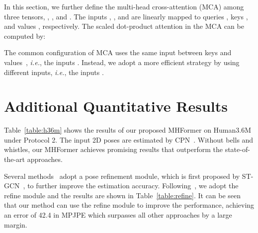 \documentclass[10pt,twocolumn,letterpaper]{article}
\begin{document}
In this section, we further define the multi-head cross-attention (MCA) among three tensors, , , and . 
The inputs , , and  are linearly mapped to queries , keys , and values , respectively. 
The scaled dot-product attention in the MCA can be computed by:    

The common configuration of MCA uses the same input between keys and values~\cite{liu2021video,xu2021cdtrans,chen2021crossvit}, \textit{i.e.}, the inputs . 
Instead, we adopt a more efficient strategy by using different inputs, \textit{i.e.}, the inputs . 

\section{Additional Quantitative Results}
Table~\ref{table:h36m} shows the results of our proposed MHFormer on Human3.6M under Protocol 2. 
The input 2D poses are estimated by CPN~\cite{chen2018cascaded}.
Without bells and whistles, our MHFormer achieves promising results that outperform the state-of-the-art approaches. 

Several methods~\cite{cai2019exploiting,wang2020motion,zou2021modulated} adopt a pose refinement module, which is first proposed by ST-GCN~\cite{cai2019exploiting}, to further improve the estimation accuracy. 
Following~\cite{cai2019exploiting}, we adopt the refine module and the results are shown in Table~\ref{table:refine}. 
It can be seen that our method can use the refine module to improve the performance, achieving an error of 42.4  in MPJPE which surpasses all other approaches by a large margin. 
\end{document}
